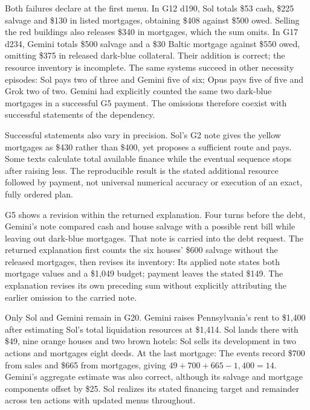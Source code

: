 Both failures declare at the first menu. In G12 d190, Sol totals \$53 cash, \$225 salvage and \$130 in listed mortgages, obtaining \$408 against \$500 owed. Selling the red buildings also releases \$340 in mortgages, which the sum omits. In G17 d234, Gemini totals \$500 salvage and a \$30 Baltic mortgage against \$550 owed, omitting \$375 in released dark-blue collateral. Their addition is correct; the resource inventory is incomplete. The same systems succeed in other necessity episodes: Sol pays two of three and Gemini five of six; Opus pays five of five and Grok two of two. Gemini had explicitly counted the same two dark-blue mortgages in a successful G5 payment. The omissions therefore coexist with successful statements of the dependency.

Successful statements also vary in precision. Sol's G2 note gives the yellow mortgages as \$430 rather than \$400, yet proposes a sufficient route and pays. Some texts calculate total available finance while the eventual sequence stops after raising less. The reproducible result is the stated additional resource followed by payment, not universal numerical accuracy or execution of an exact, fully ordered plan.

G5 shows a revision within the returned explanation. Four turns before the debt, Gemini's note compared cash and house salvage with a possible rent bill while leaving out dark-blue mortgages. That note is carried into the debt request. The returned explanation first counts the six houses' \$600 salvage without the released mortgages, then revises its inventory:
Its applied note states both mortgage values and a \$1,049 budget; payment leaves the stated \$149. The explanation revises its own preceding sum without explicitly attributing the earlier omission to the carried note.

Only Sol and Gemini remain in G20. Gemini raises Pennsylvania's rent to \$1,400 after estimating Sol's total liquidation resources at \$1,414. Sol lands there with \$49, nine orange houses and two brown hotels:
Sol sells its development in two actions and mortgages eight deeds. At the last mortgage:
The events record \$700 from sales and \$665 from mortgages, giving $49+700+665-1,400=14$. Gemini's aggregate estimate was also correct, although its salvage and mortgage components offset by \$25. Sol realizes its stated financing target and remainder across ten actions with updated menus throughout.

